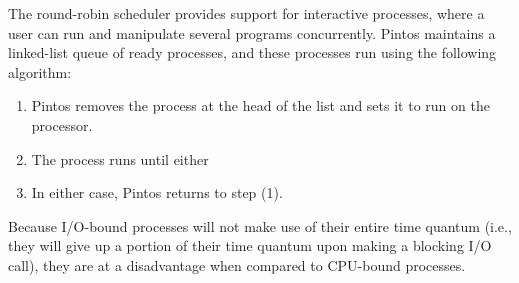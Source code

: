 \documentclass{article}
\begin{document}
The round-robin scheduler provides support for interactive processes,
where a user can run and manipulate several programs concurrently.
Pintos maintains a linked-list queue of ready processes,
and these processes run using the following algorithm:
\begin{enumerate}
\item Pintos removes the process at the head of the list and sets it to run on the processor.
\item The process runs until either
\item In either case, Pintos returns to step (1).
\end{enumerate}
Because I/O-bound processes will not make use of their entire time quantum
(i.e., they will give up a portion of their time quantum upon making a blocking I/O call),
they are at a disadvantage when compared to CPU-bound processes.
\end{document}
